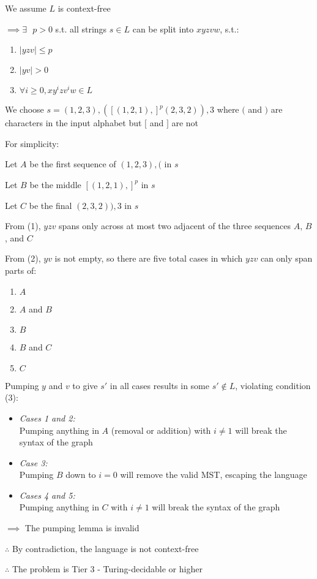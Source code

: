 \documentclass{article}
\begin{document}
We assume $L$ is context-free

$\implies\exists\textrm{ } p > 0$ s.t. all strings $s \in L$ can be split into $xyzvw$, s.t.:

\begin{enumerate}
	\item $|yzv| \leq p$
	\item $|yv| > 0$
	\item $\forall i \geq 0, x y^i z v^i w \in L$
\end{enumerate}

We choose $s = (1, 2, 3), ([(1,2,1),]^p (2,3,2)), 3$ where $($ and $)$ are characters in the input alphabet but $[$ and $]$ are not

For simplicity:

Let $A$ be the first sequence of $(1,2,3),($ in $s$

Let $B$ be the middle  $[(1,2,1),]^p$ in $s$

Let $C$ be the final $(2,3,2)), 3$ in $s$

From (1), $yzv$ spans only across at most two adjacent of the three sequences $A$, $B$, and $C$

From (2), $yv$ is not empty, so there are five total cases in which $yzv$ can only span parts of:

\begin{enumerate}
	\item $A$
	\item $A$ and $B$
	\item $B$
	\item $B$ and $C$
	\item $C$
	\end{enumerate}

Pumping $y$ and $v$ to give $s'$ in all cases results in some $s' \notin L$, violating condition (3):

\begin{itemize}
	\item \textit{Cases 1 and 2:} \\
	Pumping anything in $A$ (removal or addition) with $i \neq 1$ will break the syntax of the graph
	\item \textit{Case 3:} \\ 
	Pumping $B$ down to $i=0$ will remove the valid MST, escaping the language
	\item \textit{Cases 4 and 5:} \\
	Pumping anything in $C$ with $i \neq 1$ will break the syntax of the graph
\end{itemize}

$\implies$ The pumping lemma is invalid

$\therefore$ By contradiction, the language is not context-free

$\therefore$ The problem is Tier 3 - Turing-decidable or higher
\end{document}
